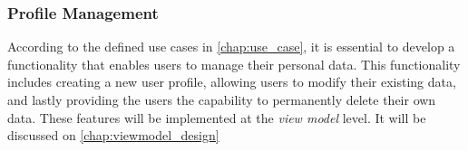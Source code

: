\subsubsection{Profile Management}
According to the defined use cases in \autoref{chap:use_case}, it is essential to develop a functionality that enables users to manage their personal data. This functionality includes creating a new user profile, allowing users to modify their existing data, and lastly providing the users the capability to permanently delete their own data. These features will be implemented at the \emph{view model} level.
It will be discussed on \autoref{chap:viewmodel_design}



